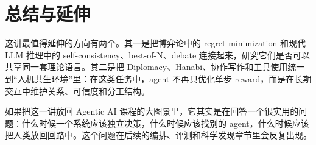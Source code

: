 \documentclass[a4paper,11pt]{article}
\begin{document}
\section{总结与延伸}
这讲最值得延伸的方向有两个。其一是把博弈论中的 regret minimization 和现代 LLM 推理中的 self-consistency、best-of-N、debate 连接起来，研究它们是否可以共享同一套理论语言。其二是把 Diplomacy、Hanabi、协作写作和工具使用统一到“人机共生环境”里：在这类任务中，agent 不再只优化单步 reward，而是在长期交互中维护关系、可信度和分工结构。

如果把这一讲放回 Agentic AI 课程的大图景里，它其实是在回答一个很实用的问题：什么时候一个系统应该独立决策，什么时候应该找别的 agent，什么时候应该把人类放回回路中。这个问题在后续的编排、评测和科学发现章节里会反复出现。
\end{document}
